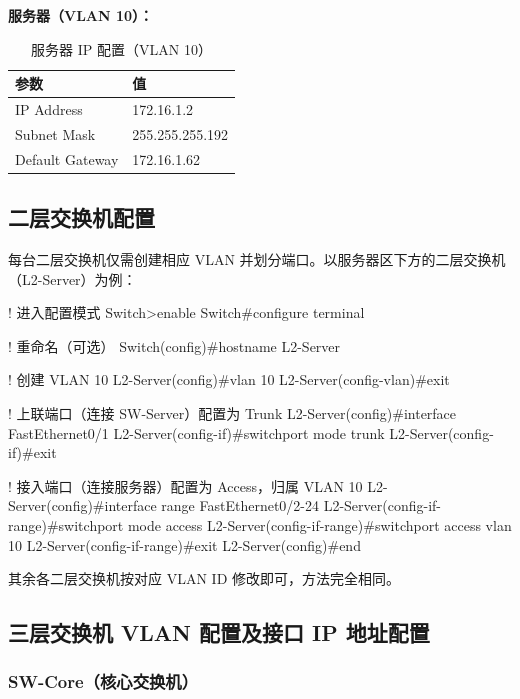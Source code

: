 \documentclass[12pt,a4paper]{ctexart}
\begin{document}
\textbf{服务器（VLAN 10）：}

\begin{table}[H]
\centering
\caption{服务器 IP 配置（VLAN 10）}
\begin{tabular}{ll}
\toprule
\textbf{参数} & \textbf{值} \\
\midrule
IP Address     & 172.16.1.2 \\
Subnet Mask    & 255.255.255.192 \\
Default Gateway& 172.16.1.62 \\
\bottomrule
\end{tabular}
\end{table}

\subsection{二层交换机配置}

每台二层交换机仅需创建相应 VLAN 并划分端口。以服务器区下方的二层交换机（L2-Server）为例：

\begin{codeblock}
! 进入配置模式
Switch>enable
Switch#configure terminal

! 重命名（可选）
Switch(config)#hostname L2-Server

! 创建 VLAN 10
L2-Server(config)#vlan 10
L2-Server(config-vlan)#exit

! 上联端口（连接 SW-Server）配置为 Trunk
L2-Server(config)#interface FastEthernet0/1
L2-Server(config-if)#switchport mode trunk
L2-Server(config-if)#exit

! 接入端口（连接服务器）配置为 Access，归属 VLAN 10
L2-Server(config)#interface range FastEthernet0/2-24
L2-Server(config-if-range)#switchport mode access
L2-Server(config-if-range)#switchport access vlan 10
L2-Server(config-if-range)#exit
L2-Server(config)#end
\end{codeblock}

其余各二层交换机按对应 VLAN ID 修改即可，方法完全相同。

\subsection{三层交换机 VLAN 配置及接口 IP 地址配置}

\subsubsection{SW-Core（核心交换机）}
\end{document}
